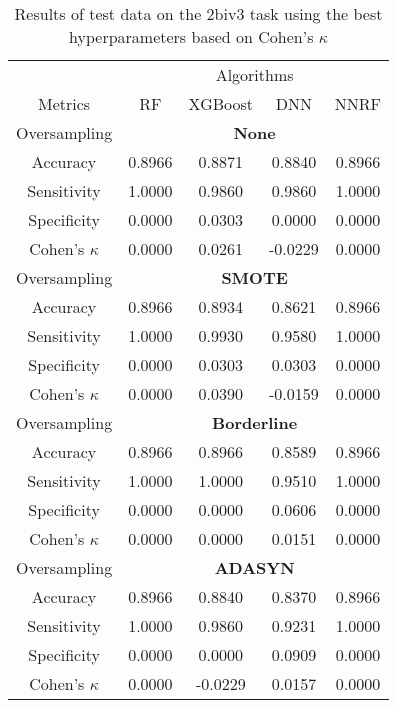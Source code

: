 \begin{table}[!htb]
\centering
\caption{Results of test data on the 2biv3 task using the best hyperparameters based on Cohen's $\kappa$}
\label{tab:2biv3_test_results}
\begin{tabular}{c | c c c c}
\hline
 & \multicolumn{4}{c}{Algorithms}\\ 
Metrics &RF & XGBoost & DNN & NNRF\\ 
\hline
Oversampling &\multicolumn{4}{|c}{\textbf{None}}\\ 
\hline
Accuracy & 0.8966 & 0.8871 & 0.8840 & 0.8966\\ 
Sensitivity & 1.0000 & 0.9860 & 0.9860 & 1.0000\\ 
Specificity & 0.0000 & 0.0303 & 0.0000 & 0.0000\\ 
Cohen's $\kappa$ & 0.0000 & 0.0261 & -0.0229 & 0.0000\\ 
\hline
Oversampling &\multicolumn{4}{|c}{\textbf{SMOTE}}\\ 
\hline
Accuracy & 0.8966 & 0.8934 & 0.8621 & 0.8966\\ 
Sensitivity & 1.0000 & 0.9930 & 0.9580 & 1.0000\\ 
Specificity & 0.0000 & 0.0303 & 0.0303 & 0.0000\\ 
Cohen's $\kappa$ & 0.0000 & 0.0390 & -0.0159 & 0.0000\\ 
\hline
Oversampling &\multicolumn{4}{|c}{\textbf{Borderline}}\\ 
\hline
Accuracy & 0.8966 & 0.8966 & 0.8589 & 0.8966\\ 
Sensitivity & 1.0000 & 1.0000 & 0.9510 & 1.0000\\ 
Specificity & 0.0000 & 0.0000 & 0.0606 & 0.0000\\ 
Cohen's $\kappa$ & 0.0000 & 0.0000 & 0.0151 & 0.0000\\ 
\hline
Oversampling &\multicolumn{4}{|c}{\textbf{ADASYN}}\\ 
\hline
Accuracy & 0.8966 & 0.8840 & 0.8370 & 0.8966\\ 
Sensitivity & 1.0000 & 0.9860 & 0.9231 & 1.0000\\ 
Specificity & 0.0000 & 0.0000 & 0.0909 & 0.0000\\ 
Cohen's $\kappa$ & 0.0000 & -0.0229 & 0.0157 & 0.0000\\ 
\hline
\end{tabular}
\end{table}


